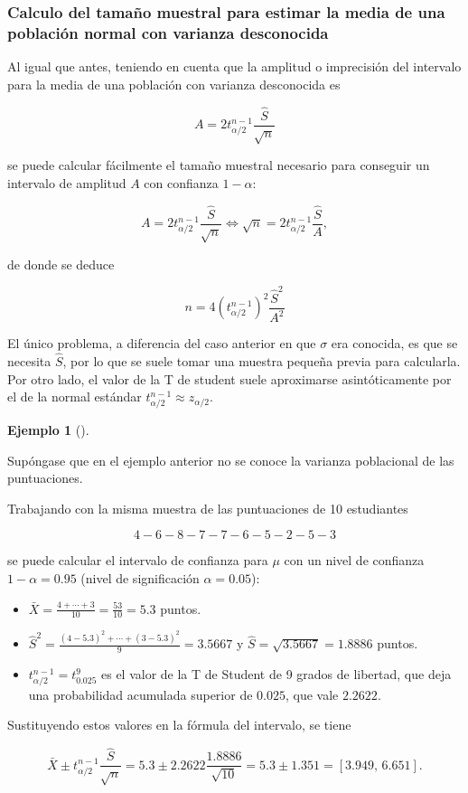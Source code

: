 \documentclass[
  a4paper,
]{scrreport}
\providecommand{\tightlist}{%
  \setlength{\itemsep}{0pt}\setlength{\parskip}{0pt}}\usepackage{longtable,booktabs,array}
\theoremstyle{plain}
\theoremstyle{definition}
\theoremstyle{definition}
\newtheorem{example}{Ejemplo}[chapter]
\theoremstyle{remark}
\begin{document}
\subsubsection{Calculo del tamaño muestral para estimar la media de una
población normal con varianza
desconocida}\label{calculo-del-tamauxf1o-muestral-para-estimar-la-media-de-una-poblaciuxf3n-normal-con-varianza-desconocida}

Al igual que antes, teniendo en cuenta que la amplitud o imprecisión del
intervalo para la media de una población con varianza desconocida es

\[
A= 2 t^{n-1}_{\alpha/2}\frac{\hat{S}}{\sqrt{n}}
\]

se puede calcular fácilmente el tamaño muestral necesario para conseguir
un intervalo de amplitud \(A\) con confianza \(1-\alpha\):

\[
A= 2 t^{n-1}_{\alpha/2}\frac{\hat{S}}{\sqrt{n}} \Leftrightarrow \sqrt{n}= 2 t^{n-1}_{\alpha/2}\frac{\hat{S}}{A},
\]

de donde se deduce

\[
{n = 4 (t^{n-1}_{\alpha/2})^2\frac{\hat{S}^2}{A^2}}
\]

El único problema, a diferencia del caso anterior en que \(\sigma\) era
conocida, es que se necesita \(\hat{S}\), por lo que se suele tomar una
muestra pequeña previa para calcularla. Por otro lado, el valor de la T
de student suele aproximarse asintóticamente por el de la normal
estándar \(t^{n-1}_{\alpha/2}\approx z_{\alpha/2}\).

\begin{example}[]\protect\hypertarget{exm-intervalo-confianza-media-normal-varianza-desconocida}{}\label{exm-intervalo-confianza-media-normal-varianza-desconocida}

Supóngase que en el ejemplo anterior no se conoce la varianza
poblacional de las puntuaciones.

Trabajando con la misma muestra de las puntuaciones de 10 estudiantes

\[
4 - 6 - 8 - 7 - 7 - 6 - 5 - 2 - 5 - 3
\]

se puede calcular el intervalo de confianza para \(\mu\) con un nivel de
confianza \(1-\alpha=0.95\) (nivel de significación \(\alpha=0.05\)):

\begin{itemize}
\tightlist
\item
  \(\bar X = \frac{4+\cdots+3}{10}= \frac{53}{10} = 5.3\) puntos.
\item
  \(\hat{S}^2= \frac{(4-5.3)^2+\cdots+(3-5.3)^2}{9} = 3.5667\) y
  \(\hat{S}=\sqrt{3.5667}=1.8886\) puntos.
\item
  \(t^{n-1}_{\alpha/2}=t^9_{0.025}\) es el valor de la T de Student de 9
  grados de libertad, que deja una probabilidad acumulada superior de
  \(0.025\), que vale \(2.2622\).
\end{itemize}

Sustituyendo estos valores en la fórmula del intervalo, se tiene

\[
\bar{X}\pm t^{n-1}_{\alpha/2}\frac{\hat{S}}{\sqrt{n}} = 5.3\pm 2.2622\frac{1.8886}{\sqrt{10}} = 5.3\pm 1.351 = \left[3.949,\,6.651\right].
\]

\end{example}
\end{document}
